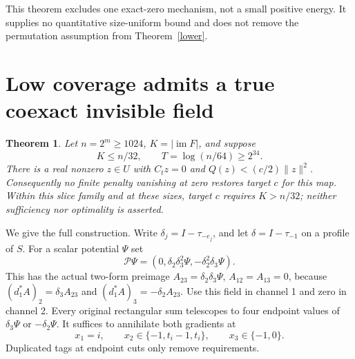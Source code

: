 \documentclass[11pt,a4paper]{article}
\newtheorem{theorem}{Theorem}[section]
\newcommand{\norm}[1]{\lVert#1\rVert}
\newcommand{\im}{\operatorname{im}}
\begin{document}
This theorem excludes one exact-zero mechanism, not a small positive energy.
It supplies no quantitative size-uniform bound and does not remove the
permutation assumption from Theorem~\ref{lower}.

\section{Low coverage admits a true coexact invisible field}\label{lowsection}
\begin{theorem}\label{low}
Let $n=2^m\geq1024$, $K=|\im F|$, and suppose
\[
 K\leq n/32,\qquad T=\log(n/64)\geq2^{34}.
\]
There is a real nonzero $z\in U$ with $C_tz=0$ and
$Q(z)<(c/2)\norm z^2$. Consequently no finite penalty vanishing at zero
restores target $c$ for this map. Within this slice family and at these sizes,
target $c$ requires $K>n/32$; neither sufficiency nor optimality is asserted.
\end{theorem}

We give the full construction. Write $\delta_j=I-\tau_{-e_j}$, and let
$\delta=I-\tau_{-1}$ on a profile of $S$. For a scalar potential $\Psi$ set
\[
 \mathcal P\Psi=(0,\delta_2\delta_3^2\Psi,-\delta_2^2\delta_3\Psi).
\]
This has the actual two-form preimage
$A_{23}=\delta_2\delta_3\Psi$, $A_{12}=A_{13}=0$, because
$(d_1^*A)_2=\delta_3A_{23}$ and $(d_1^*A)_3=-\delta_2A_{23}$.
Use this field in channel 1 and zero in channel 2. Every original rectangular
sum telescopes to four endpoint values of $\delta_3\Psi$ or
$-\delta_2\Psi$. It suffices to annihilate both gradients at
\begin{equation}\label{tags}
 x_1=i,\qquad x_2\in\{-1,t_i-1,t_i\},\qquad x_3\in\{-1,0\}.
\end{equation}
Duplicated tags at endpoint cuts only remove requirements.
\end{document}
